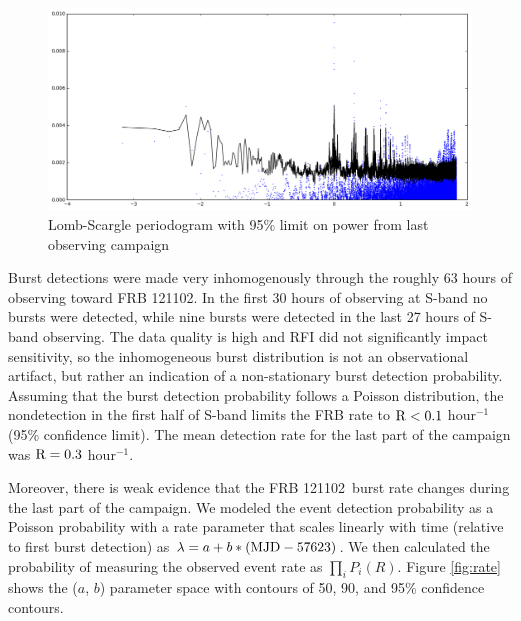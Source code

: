 \documentclass[twocolumn]{aastex61}
\newcommand{\frb}{FRB 121102}
\begin{document}
\begin{figure}[htb]
\begin{center}
\includegraphics[width=0.9\columnwidth]{lombscargle}
\caption{Lomb-Scargle periodogram with 95\% limit on power from last observing campaign
\label{fig:ls}}
\end{center}
\end{figure}

Burst detections were made very inhomogenously through the roughly 63 hours of observing toward FRB 121102. In the first 30 hours of observing at S-band no bursts were detected, while nine bursts were detected in the last 27 hours of S-band observing. The data quality is high and RFI did not significantly impact sensitivity, so the inhomogeneous burst distribution is not an observational artifact, but rather an indication of a non-stationary burst detection probability. Assuming that the burst detection probability follows a Poisson distribution, the nondetection in the first half of S-band limits the FRB rate to $\rm{R}<0.1$ hour$^{-1}$ (95\% confidence limit). The mean detection rate for the last part of the campaign was $\rm{R}=0.3$ hour$^{-1}$.

Moreover, there is weak evidence that the \frb\ burst rate changes during the last part of the campaign. We modeled the event detection probability as a Poisson probability with a rate parameter that scales linearly with time (relative to first burst detection) as $\lambda = a + b * (\rm{MJD} - 57623)$. We then calculated the probability of measuring the observed event rate as $\prod_{i} P_i(R)$. Figure \ref{fig:rate} shows the ($a$, $b$) parameter space with contours of 50, 90, and 95\% confidence contours. 
\end{document}
